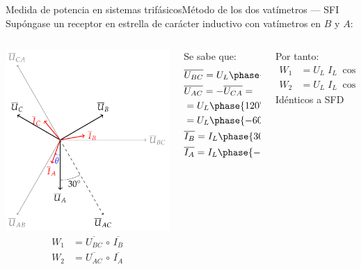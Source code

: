 \documentclass[aspectratio=169, xcolor={usenames,svgnames,dvipsnames}]{beamer}
\begin{document}
\begin{frame}{Medida de potencia en sistemas trifásicos}{Método de los dos vatímetros --- SFI}
Supóngase un receptor en estrella de carácter inductivo con vatímetros en $B$ y $A$:
\begin{columns}
\begin{column}{0.38\columnwidth}
	    \centering
	    \includegraphics[width=0.8\linewidth]{../figs/fasores_potencia3H_SFI.pdf}
	    \begin{align*}
	    W_1&=\overline{U_{BC}}\,\circ\,\overline{I_B}\\ 
	    W_2&=\overline{U_{AC}}\,\circ\,\overline{I_A}
	\end{align*}
\end{column}
\pause
\begin{column}{0.3\columnwidth}
	Se sabe que:
	\begin{align*}
	    &\overline{U_{BC}}=U_L\phase{0^\circ}\\
	   &\overline{U_{AC}}=-\overline{U_{CA}}=\\
	   &=U_L\phase{120^\circ+180^\circ}=\\
	   &=U_L\phase{-60^\circ}\\ &\overline{I_B}=I_L\phase{30^\circ-\theta} \\  &\overline{I_A}=I_L\phase{-90^\circ-\theta}
	\end{align*}
\end{column}
\pause
\begin{column}{0.3\linewidth}
Por tanto: 
	\begin{align*}
	    W_1&=U_L\;I_L\;\cos{(\theta-30^\circ)}\\ W_2&={U_L}\; {I_L}\;\cos{(\theta+30^\circ)}
	\end{align*}
	\alert{Idénticos a SFD}
\end{column}
\end{columns}
\end{frame}
\end{document}
